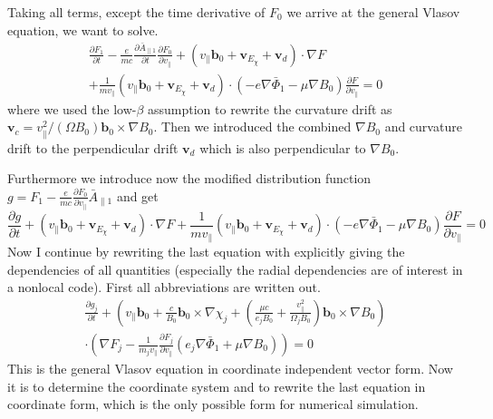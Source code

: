 Taking all terms, except the time derivative of $F_0$ we arrive at the
general Vlasov equation, we want to solve.
\begin{multline*}
  \frac{\partial F_1}{\partial t}
  -\frac{e}{mc}\frac{\partial\bar{A}_{\|1}}{\partial t}
  \frac{\partial F_0}{\partial v_\|}
  +\left(
    v_\|\mathbf{b}_0
    +\mathbf{v}_{E_\chi}
    +\mathbf{v}_d
  \right)\cdot\nabla F\\
  +\frac{1}{mv_\|}\left(
    v_\|\mathbf{b}_0
    +\mathbf{v}_{E_\chi}
    +\mathbf{v}_d
  \right)\cdot\left(
    -e\nabla\bar{\Phi}_1
    -\mu\nabla B_0
  \right)\frac{\partial F}{\partial v_\|}
  =0
\end{multline*}
where we used the low-$\beta$ assumption to rewrite
the curvature drift as $\mathbf{v}_c=v_\|^2/(\Omega B_0)
\mathbf{b}_0\times\nabla B_0$. Then we introduced the combined $\nabla
B_0$ and curvature drift to the perpendicular drift $\mathbf{v}_d$
which is also perpendicular to $\nabla B_0$. 

Furthermore we introduce now the modified distribution function
$g=F_1-\frac{e}{mc}\frac{\partial F_0}{\partial v_\|} \bar{A}_{\|1}$
and get 
\begin{displaymath}
  \frac{\partial g}{\partial t}
  +\left(
    v_\|\mathbf{b}_0
    +\mathbf{v}_{E_\chi}
    +\mathbf{v}_d
  \right)\cdot\nabla F
  +\frac{1}{mv_\|}\left(
    v_\|\mathbf{b}_0
    +\mathbf{v}_{E_\chi}
    +\mathbf{v}_d
  \right)\cdot\left(
    -e\nabla\bar{\Phi}_1
    -\mu\nabla B_0
  \right)\frac{\partial F}{\partial v_\|}
  =0
\end{displaymath}
Now I continue by rewriting the last equation with explicitly giving
the dependencies of all quantities (especially the radial
dependencies are of interest in a nonlocal code). First all
abbreviations are written out.
\begin{multline*}
  \frac{\partial g_j}{\partial t}
  +\left(
    v_\|\mathbf{b}_0
    +\frac{c}{B_0}\mathbf{b}_0\times\nabla\chi_j
    +\left(
      \frac{\mu c}{e_jB_0}
      +\frac{v_\|^2}{\Omega_j B_0}
    \right)\mathbf{b}_0\times\nabla B_0
  \right)\\
  \cdot\left(
    \nabla F_j
    -\frac{1}{m_jv_\|}\frac{\partial F_j}{\partial v_\|}\left(
      e_j\nabla\bar{\Phi}_1
      +\mu\nabla B_0
    \right)
  \right)
  =0
\end{multline*}
This is the general Vlasov equation in coordinate independent vector
form. Now it is to determine the coordinate system and to rewrite the
last equation in coordinate form, which is the only possible form for
numerical simulation. 



